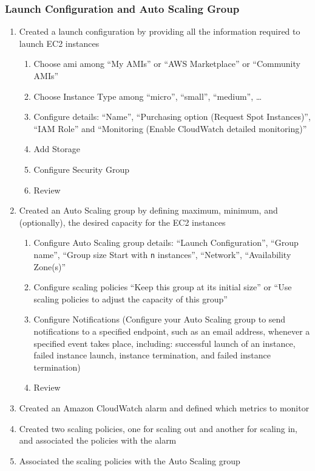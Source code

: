 \documentclass{beamer}
\begin{document}
\begin{frame}
\frametitle{Launch Configuration and Auto Scaling Group}
\begin{enumerate}
\item Created a launch configuration by providing all the information required to launch EC2 instances
\begin{enumerate}
\item Choose \acrshort{ami} among ``My AMIs'' or ``AWS Marketplace'' or ``Community AMIs''
\item Choose Instance Type among  ``micro'', ``small'', ``medium'', \dots
\item Configure details: ``Name'', ``Purchasing option (Request Spot Instances)'', ``IAM Role'' and  ``Monitoring (Enable CloudWatch detailed monitoring)''
\item Add Storage
\item Configure Security Group
\item Review
\end{enumerate}
\item Created an Auto Scaling group by defining maximum, minimum, and (optionally), the desired capacity for the EC2 instances
\begin{enumerate}
\item Configure Auto Scaling group details: ``Launch Configuration'', ``Group name'',  ``Group size Start with \texttt{n} instances'', ``Network'', ``Availability Zone(s)''
\item Configure scaling policies ``Keep this group at its initial size'' or ``Use scaling policies to adjust the capacity of this group''
\item Configure Notifications (Configure your Auto Scaling group to send notifications to a specified endpoint, such as an email address, whenever a specified event takes place, including: successful launch of an instance, failed instance launch, instance termination, and failed instance termination)
\item Review
\end{enumerate}
\item Created an Amazon CloudWatch alarm and defined which metrics to monitor
\item Created two scaling policies, one for scaling out and another for scaling in, and associated the policies with the alarm
\item Associated the scaling policies with the Auto Scaling group
\end{enumerate}

\end{frame}
\end{document}

